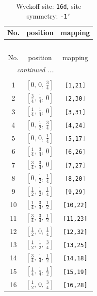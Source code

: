 \documentclass[fleqn,8pt]{jsarticle}
\begin{document}
\renewcommand{\arraystretch}{1.2}
\begin{longtable}{ccc}
\caption{Wyckoff site: {\tt 16d}, site symmetry: {\tt -1'}}
 \\
 \hline \hline
No. & position & mapping \\ \hline \endfirsthead

\multicolumn{2}{l}{\tablename\ \thetable{}} \\
 \hline \hline
No. & position & mapping \\ \hline \endhead

 \hline \hline
\multicolumn{2}{r}{\footnotesize\it continued ...} \\ \endfoot

 \hline \hline
\multicolumn{2}{r}{} \\ \endlastfoot

1 & $\left[ 0,\, 0,\, \frac{3}{4} \right]$ & {\tt [1,21]} \\ \hline
2 & $\left[ \frac{3}{4},\, \frac{1}{4},\, 0 \right]$ & {\tt [2,30]} \\ \hline
3 & $\left[ \frac{1}{4},\, \frac{1}{4},\, 0 \right]$ & {\tt [3,31]} \\ \hline
4 & $\left[ 0,\, \frac{1}{2},\, \frac{3}{4} \right]$ & {\tt [4,24]} \\ \hline
5 & $\left[ 0,\, 0,\, \frac{1}{4} \right]$ & {\tt [5,17]} \\ \hline
6 & $\left[ \frac{1}{4},\, \frac{3}{4},\, 0 \right]$ & {\tt [6,26]} \\ \hline
7 & $\left[ \frac{3}{4},\, \frac{3}{4},\, 0 \right]$ & {\tt [7,27]} \\ \hline
8 & $\left[ 0,\, \frac{1}{2},\, \frac{1}{4} \right]$ & {\tt [8,20]} \\ \hline
9 & $\left[ \frac{1}{2},\, \frac{1}{2},\, \frac{1}{4} \right]$ & {\tt [9,29]} \\ \hline
10 & $\left[ \frac{1}{4},\, \frac{3}{4},\, \frac{1}{2} \right]$ & {\tt [10,22]} \\ \hline
11 & $\left[ \frac{3}{4},\, \frac{3}{4},\, \frac{1}{2} \right]$ & {\tt [11,23]} \\ \hline
12 & $\left[ \frac{1}{2},\, 0,\, \frac{1}{4} \right]$ & {\tt [12,32]} \\ \hline
13 & $\left[ \frac{1}{2},\, \frac{1}{2},\, \frac{3}{4} \right]$ & {\tt [13,25]} \\ \hline
14 & $\left[ \frac{3}{4},\, \frac{1}{4},\, \frac{1}{2} \right]$ & {\tt [14,18]} \\ \hline
15 & $\left[ \frac{1}{4},\, \frac{1}{4},\, \frac{1}{2} \right]$ & {\tt [15,19]} \\ \hline
16 & $\left[ \frac{1}{2},\, 0,\, \frac{3}{4} \right]$ & {\tt [16,28]} \\
\end{longtable}
\end{document}
